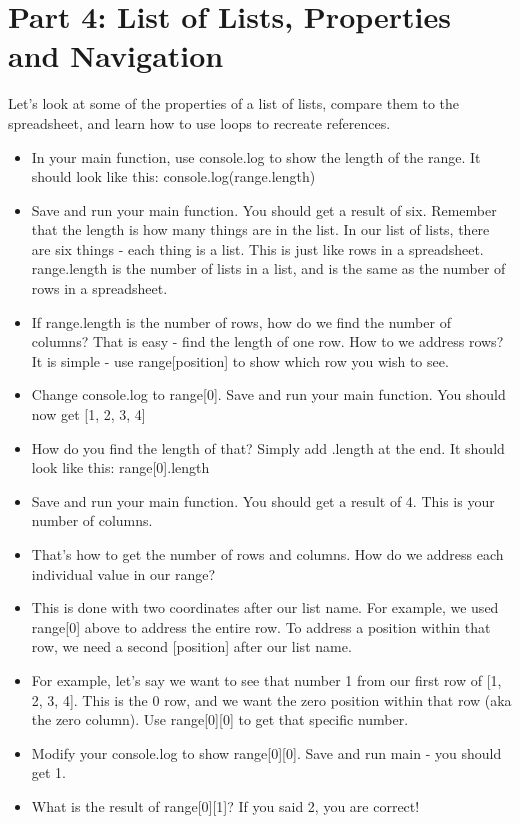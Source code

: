 \documentclass{article}
\begin{document}
\section*{Part 4: List of Lists, Properties and Navigation}
Let's look at some of the properties of a list of lists, compare them to the spreadsheet, and learn how to use loops to recreate references.
\begin{itemize}
    \item In your main function, use console.log to show the length of the range.  It should look like this:  console.log(range.length)
    \item Save and run your main function.  You should get a result of six.  Remember that the length is how many things are in the list.  In our list of lists, there are six things - each thing is a list.  This is just like rows in a spreadsheet.  range.length is the number of lists in a list, and is the same as the number of rows in a spreadsheet.
    \item If range.length is the number of rows, how do we find the number of columns?  That is easy - find the length of one row.  How to we address rows?  It is simple - use range[position] to show which row you wish to see.
    \item Change console.log to range[0].  Save and run your main function.  You should now get [1, 2, 3, 4]
    \item How do you find the length of that?  Simply add .length at the end.  It should look like this:  range[0].length 
    \item Save and run your main function.  You should get a result of 4.  This is your number of columns.  
    \item That's how to get the number of rows and columns.  How do we address each individual value in our range?  
    \item This is done with two coordinates after our list name.  For example, we used range[0] above to address the entire row.  To address a position within that row, we need a second [position] after our list name.
    \item For example, let's say we want to see that number 1 from our first row of [1, 2, 3, 4].  This is the 0 row, and we want the zero position within that row (aka the zero column).  Use range[0][0] to get that specific number.
    \item Modify your console.log to show range[0][0].  Save and run main - you should get 1.
    \item What is the result of range[0][1]?  If you said 2, you are correct! 

\end{itemize}
\end{document}
